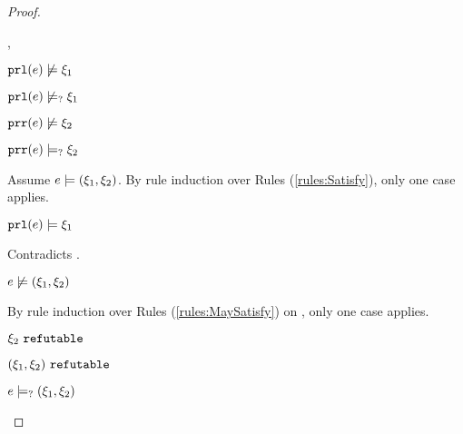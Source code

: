 \begin{proof}
\begin{byCases}
\begin{byCases}
\begin{byCases}
        \item[\cnotsatisfyormay{\hprl{e}}{\xi_1},\cmaysatisfy{\hprr{e}}{\xi_2}]
            \begin{pfsteps*}
            \item $\mathtt{prl}(e) \not\models \xi_1$  
            \item $\mathtt{prl}(e) \not\models_{?} \xi_1$  
            \item $\mathtt{prr}(e) \not\models \xi_2$  
            \item $\mathtt{prr}(e) \models_{?} \xi_2$  
            \end{pfsteps*}
            Assume $e \models (\xi_1 , \xi_2)$. By rule induction over Rules (\ref{rules:Satisfy}), only one case applies.
            \begin{byCases}
            \item[\text{(\ref{rule:CSNotValPair})}]
                \begin{pfsteps*}
                \item $\mathtt{prl}(e) \models \xi_1$ 
                \end{pfsteps*}
                Contradicts .
            \end{byCases}
            \begin{pfsteps*}
            \item $e \not\models (\xi_1 , \xi_2)$  
            \end{pfsteps*}
            By rule induction over Rules (\ref{rules:MaySatisfy}) on , only one case applies. 
            \begin{byCases}
            \item[\text{(\ref{rule:CMSNotVal})}]
                \begin{pfsteps*}
                \item $\xi_2 ~\mathtt{refutable}$  
                \item $(\xi_1 , \xi_2) ~\mathtt{refutable}$  
                \item $e \models_{?} (\xi_1 , \xi_2)$  

\end{pfsteps*}
\end{byCases}
\end{byCases}
\end{byCases}
\end{byCases}
\end{proof}
